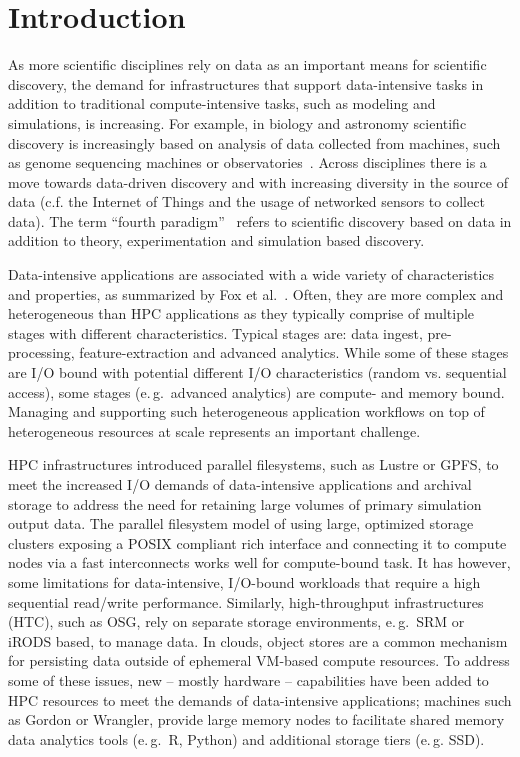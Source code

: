 \documentclass{sig-alternate}
\begin{document}
\section{Introduction}

As more scientific disciplines rely on data as an important means for
scientific discovery, the demand for infrastructures that support
data-intensive tasks in addition to traditional compute-intensive
tasks, such as modeling and simulations, is increasing. For example,
in biology and astronomy scientific discovery is increasingly based on
analysis of data collected from machines, such as genome sequencing
machines or observatories~\cite{national2014Future}.  Across
disciplines there is a move towards data-driven discovery and with
increasing diversity in the source of data (c.f. the Internet of Things
and the usage of networked sensors to collect data). The term ``fourth
paradigm''~\cite{hey2009} refers to scientific discovery based on data
in addition to theory, experimentation and simulation based discovery.

Data-intensive applications are associated with a wide variety of
characteristics and properties, as summarized by Fox et
al.~\cite{bigdata-ogres,bigdata-use-cases-nist}. Often, they are more
complex and heterogeneous than HPC applications as they typically
comprise of multiple stages with different characteristics. Typical
stages are: data ingest, pre-processing, feature-extraction and
advanced analytics. While some of these stages are I/O bound with
potential different I/O characteristics (random vs.  sequential
access), some stages (e.\,g.\ advanced analytics) are compute- and
memory bound. Managing and supporting such heterogeneous application
workflows on top of heterogeneous resources at scale represents an
important challenge.

HPC infrastructures introduced parallel filesystems, such as Lustre or
GPFS, to meet the increased I/O demands of data-intensive applications
and archival storage to address the need for retaining large volumes
of primary simulation output data. The parallel filesystem model of
using large, optimized storage clusters exposing a POSIX compliant
rich interface and connecting it to compute nodes via a fast
interconnects works well for compute-bound task. It has however, some
limitations for data-intensive, I/O-bound workloads that require a
high sequential read/write performance. Similarly, high-throughput
infrastructures (HTC), such as OSG, rely on separate storage
environments, e.\,g.\ SRM or iRODS based, to manage data. In clouds,
object stores are a common mechanism for persisting data outside of
ephemeral VM-based compute resources. To address some of these issues,
new -- mostly hardware -- capabilities have been added to HPC
resources to meet the demands of data-intensive applications; machines
such as Gordon or Wrangler, provide large memory nodes to facilitate
shared memory data analytics tools (e.\,g.\ R, Python) and additional
storage tiers (e.\,g. SSD).
\end{document}
